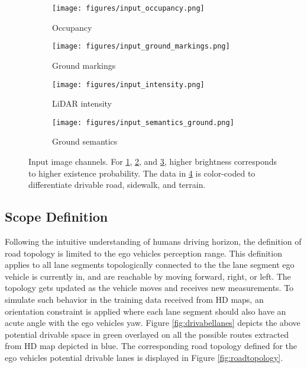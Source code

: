 \documentclass[10pt,twocolumn,letterpaper]{article}
\begin{document}
\begin{figure}
     \centering
     \begin{subfigure}[b]{0.49\linewidth}
         \centering
         \texttt{[image: figures/input\_occupancy.png]}
         \caption{Occupancy}
         \label{fig:inputlayers_occupancy}
     \end{subfigure}
     \begin{subfigure}[b]{0.49\linewidth}
         \centering
         \texttt{[image: figures/input\_ground\_markings.png]}
         \caption{Ground markings}
         \label{fig:inputlayers_groundmarkings}
     \end{subfigure}
     \begin{subfigure}[b]{0.49\linewidth}
         \centering
         \texttt{[image: figures/input\_intensity.png]}
         \caption{LiDAR intensity}
         \label{fig:inputlayers_intensity}
     \end{subfigure}
     \begin{subfigure}[b]{0.49\linewidth}
         \centering
         \texttt{[image: figures/input\_semantics\_ground.png]}
         \caption{Ground semantics}
         \label{fig:inputlayers_groundsemantics}
     \end{subfigure}
        \caption{Input image channels. For \ref{fig:inputlayers_occupancy}, \ref{fig:inputlayers_groundmarkings}, and \ref{fig:inputlayers_intensity}, higher brightness corresponds to higher existence probability. The data in \ref{fig:inputlayers_groundsemantics} is color-coded to differentiate drivable road, sidewalk, and terrain.}
        \label{fig:inputlayers}
\end{figure}
\subsection{Scope Definition}
\label{sect:scope_definition}
Following the intuitive understanding of human\textquotesingle s driving horizon, the definition of road topology is limited to the ego vehicle\textquotesingle s perception range. This definition applies to all lane segments topologically connected to the the lane segment ego vehicle is currently in, and are reachable by moving forward, right, or left. The topology gets updated as the vehicle moves and receives new measurements. To simulate such behavior in the training data received from HD maps, an orientation constraint is applied where each lane segment should also have an acute angle with the ego vehicle\textquotesingle s yaw. Figure \ref{fig:drivabellanes} depicts the above potential drivable space in green overlayed on all the possible routes extracted from HD map depicted in blue. The corresponding road topology defined for the ego vehicle\textquotesingle s potential drivable lanes is displayed in Figure \ref{fig:roadtopology}.
\end{document}
